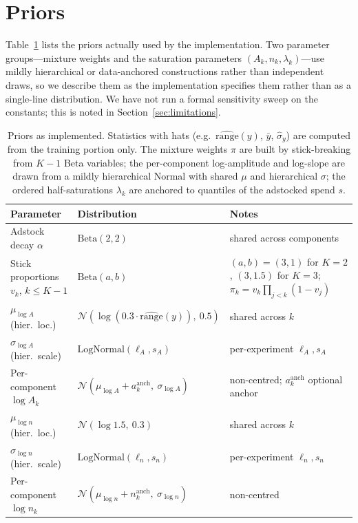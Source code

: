 \documentclass[11pt]{article}
\begin{document}
\section{Priors}
\label{app:priors}

Table~\ref{tab:priors} lists the priors actually used by the implementation. Two parameter groups---mixture weights and the saturation parameters $(A_k, n_k, \lambda_k)$---use mildly hierarchical or data-anchored constructions rather than independent draws, so we describe them as the implementation specifies them rather than as a single-line distribution. We have not run a formal sensitivity sweep on the constants; this is noted in Section~\ref{sec:limitations}.

\begin{table}[ht]
\centering
\caption{Priors as implemented. Statistics with hats (e.g.\ $\widehat{\text{range}}(y)$, $\bar{y}$, $\hat\sigma_y$) are computed from the training portion only. The mixture weights $\pi$ are built by stick-breaking from $K-1$ Beta variables; the per-component log-amplitude and log-slope are drawn from a mildly hierarchical Normal with shared $\mu$ and hierarchical $\sigma$; the ordered half-saturations $\lambda_k$ are anchored to quantiles of the adstocked spend $s$.}
\label{tab:priors}
\small
\begin{tabular}{p{}p{}p{}}
\toprule
Parameter & Distribution & Notes \\
\midrule
Adstock decay $\alpha$ & $\text{Beta}(2, 2)$ & shared across components \\
Stick proportions $v_k$, $k\le K{-}1$ & $\text{Beta}(a, b)$ & $(a,b){=}(3,1)$ for $K{=}2$, $(3, 1.5)$ for $K{=}3$; $\pi_k {=} v_k \prod_{j<k}(1{-}v_j)$ \\
$\mu_{\log A}$ (hier.\ loc.) & $\mathcal{N}(\log(0.3 \cdot \widehat{\text{range}}(y)),\ 0.5)$ & shared across $k$ \\
$\sigma_{\log A}$ (hier.\ scale) & $\text{LogNormal}(\ell_A, s_A)$ & per-experiment $\ell_A, s_A$ \\
Per-component $\log A_k$ & $\mathcal{N}(\mu_{\log A} {+} a^{\text{anch}}_k,\ \sigma_{\log A})$ & non-centred; $a^{\text{anch}}_k$ optional anchor \\
$\mu_{\log n}$ (hier.\ loc.) & $\mathcal{N}(\log 1.5,\ 0.3)$ & shared across $k$ \\
$\sigma_{\log n}$ (hier.\ scale) & $\text{LogNormal}(\ell_n, s_n)$ & per-experiment $\ell_n, s_n$ \\
Per-component $\log n_k$ & $\mathcal{N}(\mu_{\log n} {+} n^{\text{anch}}_k,\ \sigma_{\log n})$ & non-centred \\

\end{tabular}
\end{table}
\end{document}
